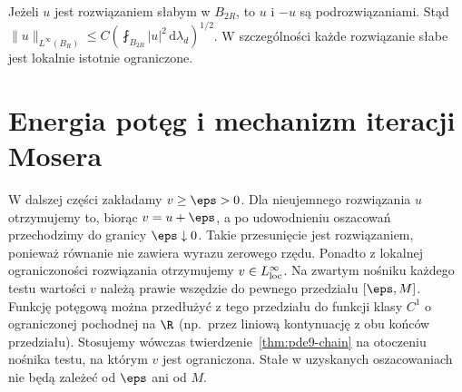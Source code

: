 \begin{wniosek}
Jeżeli $u$ jest rozwiązaniem słabym w $B_{2R}$, to
$u$ i $-u$ są podrozwiązaniami. Stąd
$\|u\|_{L^\infty(B_R)}\le C(\fint_{B_{2R}}|u|^2\,\mathrm d\lambda_d)^{1/2}$.
W szczególności każde rozwiązanie słabe jest lokalnie
istotnie ograniczone.
\end{wniosek}

\section{Energia potęg i mechanizm iteracji Mosera}
\label{sec:pde17-moser}
W dalszej części zakładamy $v\ge\eps>0$. Dla nieujemnego
rozwiązania $u$ otrzymujemy to, biorąc $v=u+\eps$,
a po udowodnieniu oszacowań przechodzimy do granicy
$\eps\downarrow0$. Takie przesunięcie jest rozwiązaniem,
ponieważ równanie nie zawiera wyrazu zerowego rzędu.
Ponadto z lokalnej ograniczoności rozwiązania otrzymujemy
$v\in L^\infty_{\rm loc}$. Na zwartym nośniku każdego testu
wartości $v$ należą prawie wszędzie do pewnego przedziału
$[\eps,M]$. Funkcję potęgową można przedłużyć z tego przedziału
do funkcji klasy $C^1$ o ograniczonej pochodnej na $\R$
(np.\ przez liniową kontynuację z obu końców przedziału).
Stosujemy wówczas twierdzenie~\ref{thm:pde9-chain}
na otoczeniu nośnika testu, na którym $v$ jest ograniczona. Stałe w uzyskanych oszacowaniach
nie będą zależeć od $\eps$ ani od $M$.

